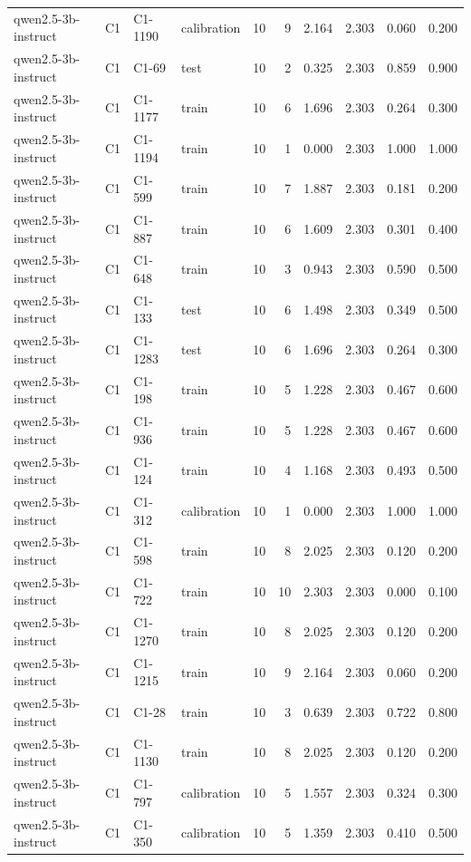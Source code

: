 \begin{table}
\begin{tabular}{llllrrrrrr}
qwen2.5-3b-instruct & C1 & C1-1190 & calibration & 10 & 9 & 2.164 & 2.303 & 0.060 & 0.200 \\
qwen2.5-3b-instruct & C1 & C1-69 & test & 10 & 2 & 0.325 & 2.303 & 0.859 & 0.900 \\
qwen2.5-3b-instruct & C1 & C1-1177 & train & 10 & 6 & 1.696 & 2.303 & 0.264 & 0.300 \\
qwen2.5-3b-instruct & C1 & C1-1194 & train & 10 & 1 & 0.000 & 2.303 & 1.000 & 1.000 \\
qwen2.5-3b-instruct & C1 & C1-599 & train & 10 & 7 & 1.887 & 2.303 & 0.181 & 0.200 \\
qwen2.5-3b-instruct & C1 & C1-887 & train & 10 & 6 & 1.609 & 2.303 & 0.301 & 0.400 \\
qwen2.5-3b-instruct & C1 & C1-648 & train & 10 & 3 & 0.943 & 2.303 & 0.590 & 0.500 \\
qwen2.5-3b-instruct & C1 & C1-133 & test & 10 & 6 & 1.498 & 2.303 & 0.349 & 0.500 \\
qwen2.5-3b-instruct & C1 & C1-1283 & test & 10 & 6 & 1.696 & 2.303 & 0.264 & 0.300 \\
qwen2.5-3b-instruct & C1 & C1-198 & train & 10 & 5 & 1.228 & 2.303 & 0.467 & 0.600 \\
qwen2.5-3b-instruct & C1 & C1-936 & train & 10 & 5 & 1.228 & 2.303 & 0.467 & 0.600 \\
qwen2.5-3b-instruct & C1 & C1-124 & train & 10 & 4 & 1.168 & 2.303 & 0.493 & 0.500 \\
qwen2.5-3b-instruct & C1 & C1-312 & calibration & 10 & 1 & 0.000 & 2.303 & 1.000 & 1.000 \\
qwen2.5-3b-instruct & C1 & C1-598 & train & 10 & 8 & 2.025 & 2.303 & 0.120 & 0.200 \\
qwen2.5-3b-instruct & C1 & C1-722 & train & 10 & 10 & 2.303 & 2.303 & 0.000 & 0.100 \\
qwen2.5-3b-instruct & C1 & C1-1270 & train & 10 & 8 & 2.025 & 2.303 & 0.120 & 0.200 \\
qwen2.5-3b-instruct & C1 & C1-1215 & train & 10 & 9 & 2.164 & 2.303 & 0.060 & 0.200 \\
qwen2.5-3b-instruct & C1 & C1-28 & train & 10 & 3 & 0.639 & 2.303 & 0.722 & 0.800 \\
qwen2.5-3b-instruct & C1 & C1-1130 & train & 10 & 8 & 2.025 & 2.303 & 0.120 & 0.200 \\
qwen2.5-3b-instruct & C1 & C1-797 & calibration & 10 & 5 & 1.557 & 2.303 & 0.324 & 0.300 \\
qwen2.5-3b-instruct & C1 & C1-350 & calibration & 10 & 5 & 1.359 & 2.303 & 0.410 & 0.500 \\

\end{tabular}
\end{table}
